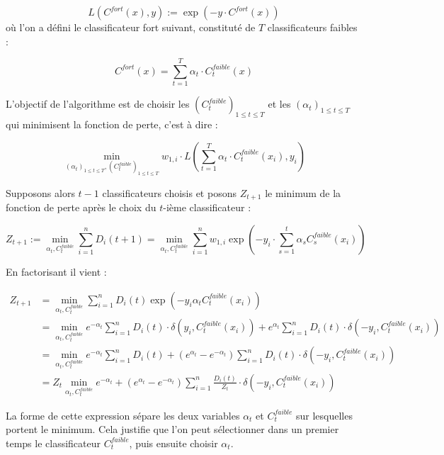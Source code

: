 \documentclass[12pt,a4paper]{article}
\begin{document}
\begin{equation}
    L(C^{fort}(x), y) := \exp(-y \cdot C^{fort}(x))
\end{equation}
où l'on a défini le classificateur fort suivant, constituté de $T$ classificateurs faibles :

\[
    C^{fort}(x) = \sum_{t=1}^T \alpha_t \cdot C_t^{faible}(x)
\]

L'objectif de l'algorithme est de choisir les $(C_t^{faible})_{1 \leq t \leq T}$ et les $(\alpha_t)_{1 \leq t \leq T}$ qui minimisent la fonction de perte, c'est à dire :

\[
    \min_{(\alpha_t)_{1 \leq t \leq T},(C_t^{faible})_{1 \leq t \leq T}} w_{1, i} \cdot L\left(\sum_{t=1}^T \alpha_t \cdot C_t^{faible}(x_i), y_i\right)
\]

Supposons alors $t-1$ classificateurs choisis et posons $Z_{t+1}$ le minimum de la fonction de perte après le choix du $t$-ième classificateur :

\begin{equation}
    Z_{t+1} := \min_{\alpha_t, C_t^{faible}} \sum_{i=1}^n D_i(t+1)= \min_{\alpha_t, C_t^{faible}} \sum_{i=1}^n w_{1, i} \exp\left(-y_i \cdot \sum_{s=1}^t \alpha_s C_s^{faible}(x_i)\right)
\end{equation}

En factorisant il vient :

\begin{equation*}
\begin{split}
    Z_{t+1}  & = \min_{\alpha_t, C_t^{faible}} \sum_{i=1}^n D_i(t) \exp\left(-y_i \alpha_t C_t^{faible}(x_i)\right) \\
    & = \min_{\alpha_t, C_t^{faible}} e^{-\alpha_t} \sum_{i=1}^n D_i(t) \cdot \delta(y_i, C_t^{faible}(x_i)) + e^{\alpha_t} \sum_{i=1}^n D_i(t) \cdot \delta(-y_i, C_t^{faible}(x_i)) \\
    & = \min_{\alpha_t, C_t^{faible}} e^{-\alpha_t} \sum_{i=1}^n D_i(t)  + (e^{\alpha_t} - e^{-\alpha_t}) \sum_{i=1}^n D_i(t) \cdot \delta(-y_i, C_t^{faible}(x_i)) \\
    & = Z_t \min_{\alpha_t, C_t^{faible}} e^{-\alpha_t}  + (e^{\alpha_t} - e^{-\alpha_t}) \sum_{i=1}^n \frac{D_i(t)}{Z_t} \cdot \delta(-y_i, C_t^{faible}(x_i))
\end{split}
\end{equation*}

La forme de cette expression sépare les deux variables $\alpha_t$ et $C_t^{faible}$ sur lesquelles portent le minimum. Cela justifie que l'on peut sélectionner dans un premier temps le classificateur $C_t^{faible}$, puis ensuite choisir $\alpha_t$.
\end{document}

